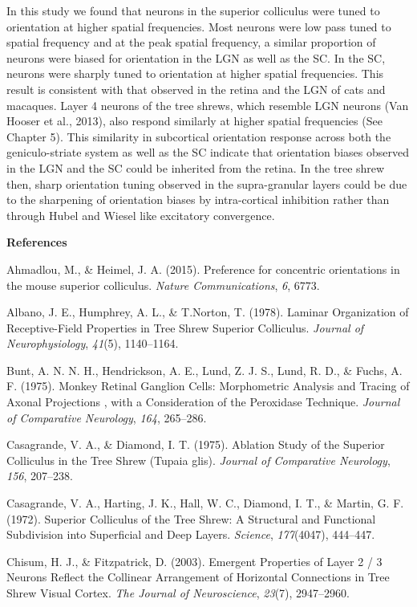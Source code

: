 In this study we found that neurons in the superior colliculus were
tuned to orientation at higher spatial frequencies. Most neurons were
low pass tuned to spatial frequency and at the peak spatial frequency, a
similar proportion of neurons were biased for orientation in the LGN as
well as the SC. In the SC, neurons were sharply tuned to orientation at
higher spatial frequencies. This result is consistent with that observed
in the retina and the LGN of cats and macaques. Layer 4 neurons of the
tree shrews, which resemble LGN neurons (Van Hooser et al., 2013), also
respond similarly at higher spatial frequencies (See Chapter 5). This
similarity in subcortical orientation response across both the
geniculo-striate system as well as the SC indicate that orientation
biases observed in the LGN and the SC could be inherited from the
retina. In the tree shrew then, sharp orientation tuning observed in the
supra-granular layers could be due to the sharpening of orientation
biases by intra-cortical inhibition rather than through Hubel and Wiesel
like excitatory convergence.

\textbf{References}

Ahmadlou, M., \& Heimel, J. A. (2015). Preference for concentric
orientations in the mouse superior colliculus. \emph{Nature
Communications}, \emph{6}, 6773.

Albano, J. E., Humphrey, A. L., \& T.Norton, T. (1978). Laminar
Organization of Receptive-Field Properties in Tree Shrew Superior
Colliculus. \emph{Journal of Neurophysiology}, \emph{41}(5), 1140--1164.

Bunt, A. N. N. H., Hendrickson, A. E., Lund, Z. J. S., Lund, R. D., \&
Fuchs, A. F. (1975). Monkey Retinal Ganglion Cells: Morphometric
Analysis and Tracing of Axonal Projections , with a Consideration of the
Peroxidase Technique. \emph{Journal of Comparative Neurology},
\emph{164}, 265--286.

Casagrande, V. A., \& Diamond, I. T. (1975). Ablation Study of the
Superior Colliculus in the Tree Shrew (Tupaia glis). \emph{Journal of
Comparative Neurology}, \emph{156}, 207--238.

Casagrande, V. A., Harting, J. K., Hall, W. C., Diamond, I. T., \&
Martin, G. F. (1972). Superior Colliculus of the Tree Shrew: A
Structural and Functional Subdivision into Superficial and Deep Layers.
\emph{Science}, \emph{177}(4047), 444--447.

Chisum, H. J., \& Fitzpatrick, D. (2003). Emergent Properties of Layer 2
/ 3 Neurons Reflect the Collinear Arrangement of Horizontal Connections
in Tree Shrew Visual Cortex. \emph{The Journal of Neuroscience},
\emph{23}(7), 2947--2960.

